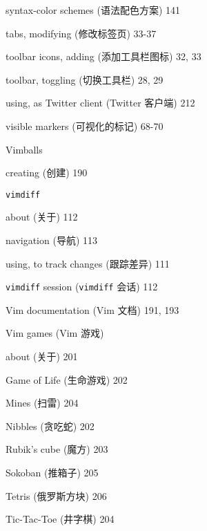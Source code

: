 \begin{multicols}{2}
\hangindent=3pc \quad syntax-color schemes (语法配色方案) 141 \par
\hangindent=3pc \quad tabs, modifying (修改标签页) 33-37 \par
\hangindent=3pc \quad toolbar icons, adding (添加工具栏图标) 32, 33 \par
\hangindent=3pc \quad toolbar, toggling (切换工具栏) 28, 29 \par
\hangindent=3pc \quad using, as Twitter client (Twitter 客户端) 212 \par
\hangindent=3pc \quad visible markers (可视化的标记) 68-70 \par

\hangindent=3pc  Vimballs \par
\hangindent=3pc \quad creating (创建) 190 \par

\hangindent=3pc  \texttt{vimdiff} \par
\hangindent=3pc \quad about (关于) 112 \par
\hangindent=3pc \quad navigation (导航) 113 \par
\hangindent=3pc \quad using, to track changes (跟踪差异) 111 \par

\hangindent=3pc  \texttt{vimdiff} session (\texttt{vimdiff} 会话) 112

\hangindent=3pc  Vim documentation (Vim 文档) 191, 193

\hangindent=3pc  Vim games (Vim 游戏) \par
\hangindent=3pc \quad about (关于) 201 \par
\hangindent=3pc \quad Game of Life (生命游戏) 202 \par
\hangindent=3pc \quad Mines (扫雷) 204 \par
\hangindent=3pc \quad Nibbles (贪吃蛇) 202 \par
\hangindent=3pc \quad Rubik's cube (魔方) 203 \par
\hangindent=3pc \quad Sokoban (推箱子) 205 \par
\hangindent=3pc \quad Tetris (俄罗斯方块) 206 \par
\hangindent=3pc \quad Tic-Tac-Toe (井字棋) 204 \par


\end{multicols}
